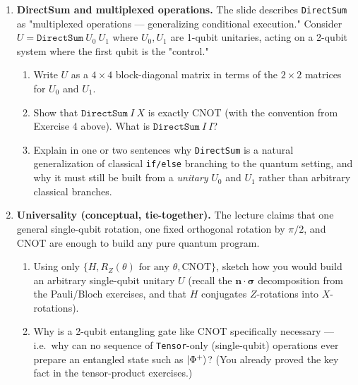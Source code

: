 \documentclass[11pt]{article}
\begin{document}
\begin{enumerate}[label=\textbf{Exercise \arabic*.}, leftmargin=2.2cm]
\item \textbf{DirectSum and multiplexed operations.}
The slide describes \texttt{DirectSum} as "multiplexed operations —
generalizing conditional execution." Consider
$U = \texttt{DirectSum}\ U_0\ U_1$ where $U_0,U_1$ are 1-qubit unitaries,
acting on a 2-qubit system where the first qubit is the "control."
\begin{enumerate}[label=(\alph*)]
\item Write $U$ as a $4\times4$ block-diagonal matrix in terms of the
$2\times2$ matrices for $U_0$ and $U_1$.
\item Show that $\texttt{DirectSum}\ I\ X$ is exactly CNOT (with the
convention from Exercise 4 above). What is $\texttt{DirectSum}\ I\ I$?
\item Explain in one or two sentences why \texttt{DirectSum} is a
natural generalization of classical \texttt{if/else} branching to the
quantum setting, and why it must still be built from a \emph{unitary}
$U_0$ and $U_1$ rather than arbitrary classical branches.
\end{enumerate}

\item \textbf{Universality (conceptual, tie-together).}
The lecture claims that one general single-qubit rotation, one fixed
orthogonal rotation by $\pi/2$, and CNOT are enough to build any pure
quantum program.
\begin{enumerate}[label=(\alph*)]
\item Using only $\{H, R_Z(\theta) \text{ for any } \theta, \mathrm{CNOT}\}$,
sketch how you would build an arbitrary single-qubit unitary $U$ (recall
the $\mathbf n\cdot\boldsymbol\sigma$ decomposition from the Pauli/Bloch
exercises, and that $H$ conjugates $Z$-rotations into $X$-rotations).
\item Why is a 2-qubit entangling gate like CNOT specifically necessary
--- i.e.\ why can no sequence of \texttt{Tensor}-only (single-qubit)
operations ever prepare an entangled state such as $\ket{\Phi^+}$? (You
already proved the key fact in the tensor-product exercises.)
\end{enumerate}

\end{enumerate}
\end{document}
